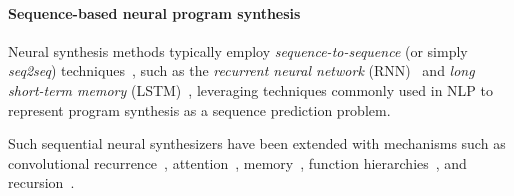 \documentclass{article}
\begin{document}




\paragraph{Sequence-based neural program synthesis} %

Neural synthesis methods typically employ \emph{sequence-to-sequence}
(or simply \emph{seq2seq}) techniques~\citep{npi,neuralmachinetranslation,alphanpi},
such as the \emph{recurrent neural network} (RNN)~\citep{backproprnn}
and \emph{long short-term memory} (LSTM)~\citep{lstm},
leveraging techniques commonly used in NLP
to represent program synthesis as a sequence prediction problem.%

Such sequential neural synthesizers have been extended with mechanisms such as
convolutional recurrence~\citep{neuralgpu},
attention~\citep{nmt,ptrnets,structuredattention},
memory~\citep{ntm,neuralram,neuralprogrammer,hierarchicalmemory},
function hierarchies~\citep{npi,npl},
and recursion~\citep{cai2017making}.
\end{document}
